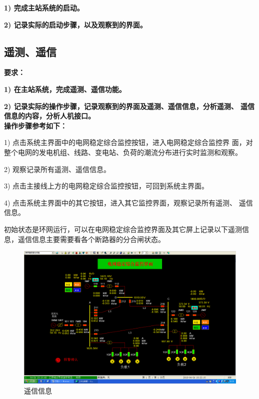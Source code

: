 \documentclass[a4paper]{ctexrep}
\begin{document}
                    \textbf{1) 完成主站系统的启动。}

                    \textbf{2) 记录实际的启动步骤，以及观察到的界面。}

                \subsection{遥测、遥信}
                    \textbf{要求：}

                    \textbf{1) 在主站系统，完成遥测、遥信功能。}

                    \textbf{2) 记录实际的操作步骤，记录观察到的界面及遥测、遥信信息，分析遥测、 遥信信息的内容，分析人机接口。} \\

                    \textbf{操作步骤参考如下：}

                    1) 点击系统主界面中的电网稳定综合监控按钮，进入电网稳定综合监控界 面，对整个电网的发电机组、线路、变电站、负荷的潮流分布进行实时监测和观察。 
                    
                    2) 观察记录所有遥测、遥信信息。 
                    
                    3) 点击主接线上方的电网稳定综合监控按钮，可回到系统主界面。 
                    
                    4) 点击系统主界面中的其它按钮，进入其它监控界面，观察记录所有遥测、 遥信信息。
                    
                    初始状态是环网运行，可以在电网稳定综合监控界面及其它屏上记录以下遥测信息，遥信信息主要需要看各个断路器的分合闸状态。

                    \begin{figure}[htbp]
                        \centering
                        \includegraphics[width=12cm]{16.png}
                        \caption{遥信信息}
                    \end{figure}
\end{document}
